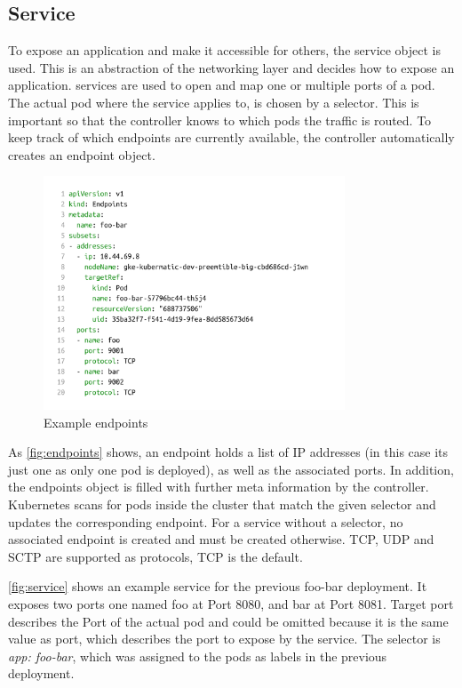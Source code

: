 \subsection{Service}\label{subsec:service}
To expose an application and make it accessible for others, the service object is used.
This is an abstraction of the networking layer and decides how to expose an application.
services are used to open and map one or multiple ports of a pod.
The actual pod where the service applies to, is chosen by a selector.
This is important so that the controller knows to which pods the traffic is routed.
To keep track of which endpoints are currently available, the controller automatically creates an endpoint object.

\begin{figure}[H]
    \centering
    \includegraphics[width=0.8\textwidth, left]{media/02/endpoint}
    \caption{Example endpoints}
    \label{fig:endpoints}
\end{figure}

As \autoref{fig:endpoints} shows, an endpoint holds a list of IP addresses (in this case its just one as only one pod is deployed), as well as the associated ports.
In addition, the endpoints object is filled with further meta information by the controller.
Kubernetes scans for pods inside the cluster that match the given selector and updates the corresponding endpoint.
For a service without a selector, no associated endpoint is created and must be created otherwise.
TCP, UDP and SCTP are supported as protocols, TCP is the default.

\autoref{fig:service} shows an example service for the previous foo-bar deployment.
It exposes two ports one named foo at Port 8080, and bar at Port 8081.
Target port describes the Port of the actual pod and could be omitted because it is the same value as port, which describes the port to expose by the service.
The selector is \textit{app: foo-bar}, which was assigned to the pods as labels in the previous deployment.

